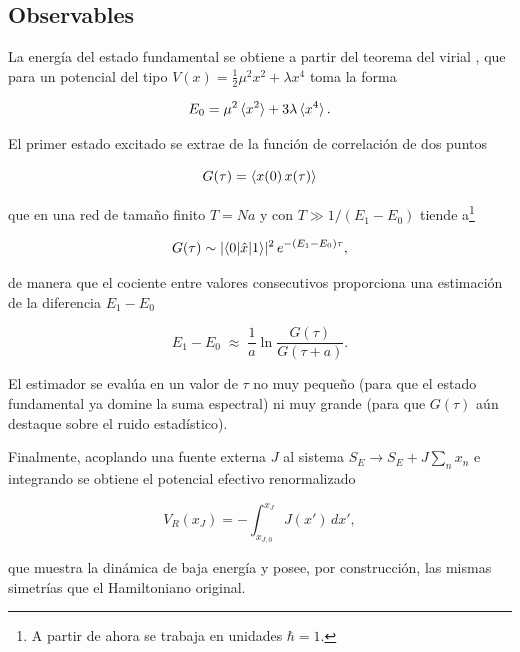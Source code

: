 \documentclass[11pt,a4paper,twoside,pdf]{article}
\numberwithin{equation}{section}
\begin{document}
\subsection{Observables}
\label{obs}

La energía del estado fundamental se obtiene a partir del teorema del virial \cite{creutz1981statistical}, que para un potencial del tipo $V(x) = \frac12 \mu^2 x^2 + \lambda x^4$ toma la forma

\begin{equation}
    E_0 = \mu^2 \braket{x^2} + 3\lambda \braket{x^4}.
    \label{virial}
\end{equation}

\medskip

El primer estado excitado se extrae de la función de correlación de dos puntos

\begin{equation}
    G(\tau) = \braket{x(0)\, x(\tau)}
\end{equation}

que en una red de tamaño finito $T = Na$ y con $T \gg 1/(E_1 - E_0)$ tiende a\footnote{A partir de ahora se trabaja en unidades $\hbar = 1$.} 

\begin{equation}
    G(\tau) \sim |\!\braket{0|\hat{x}|1}\!|^2 \, e^{-(E_1 - E_0)\tau},
\end{equation}

de manera que el cociente entre valores consecutivos proporciona una estimación de la diferencia $E_1 - E_0$

\begin{equation}
    E_1 - E_0 \;\approx\; \frac{1}{a}\ln \frac{G(\tau)}{G(\tau + a)}.
    \label{E1mE0}
\end{equation}

El estimador se evalúa en un valor de $\tau$ no muy pequeño (para que el estado fundamental ya domine la suma espectral) ni muy grande (para que $G(\tau)$ aún destaque sobre el ruido estadístico).


Finalmente, acoplando una fuente externa $J$ al sistema $S_E \to S_E + J \sum_n x_n$ e integrando se obtiene el potencial efectivo renormalizado \cite{creutz1981statistical}

\begin{equation}
    V_R(x_J) = -\int_{x_{J,0}}^{x_J} J(x') \, dx',
    \label{VR}
\end{equation}

que muestra la dinámica de baja energía y posee, por construcción, las mismas simetrías que el Hamiltoniano original.
\end{document}
